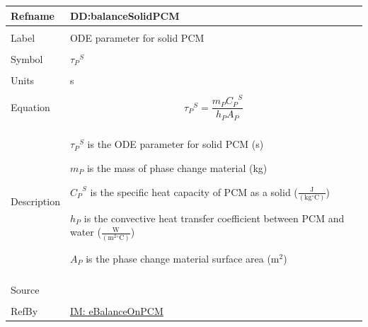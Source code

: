 \documentclass[12pt]{article}
\begin{document}
\noindent \begin{minipage}{\textwidth}
\begin{tabular}{>{\raggedright}p{}>{\raggedright\arraybackslash}p{}}
\toprule \textbf{Refname} & \textbf{DD:balanceSolidPCM}
\label{DD:balanceSolidPCM}
\\ \midrule \\
Label & ODE parameter for solid PCM
\\ \midrule \\
Symbol & ${{τ_{P}}^{S}}$
\\ \midrule \\
Units & s
\\ \midrule \\
Equation & \begin{displaymath}
           {{τ_{P}}^{S}}=\frac{{m_{P}} {{C_{P}}^{S}}}{{h_{P}} {A_{P}}}
           \end{displaymath}
\\ \midrule \\
Description & \begin{symbDescription}
              \item{${{τ_{P}}^{S}}$ is the ODE parameter for solid PCM (s)}
              \item{${m_{P}}$ is the mass of phase change material (kg)}
              \item{${{C_{P}}^{S}}$ is the specific heat capacity of PCM as a solid ($\frac{\text{J}}{(\text{kg}{}^{\circ}\text{C})}$)}
              \item{${h_{P}}$ is the convective heat transfer coefficient between PCM and water ($\frac{\text{W}}{(\text{m}^{2}{}^{\circ}\text{C})}$)}
              \item{${A_{P}}$ is the phase change material surface area ($\text{m}^{2}$)}
              \end{symbDescription}
\\ \midrule \\
Source & \cite{lightstone2012}
\\ \midrule \\
RefBy & \hyperref[IM:eBalanceOnPCM]{IM: eBalanceOnPCM}
\\ \bottomrule
\end{tabular}
\end{minipage}
\par~
\end{document}
